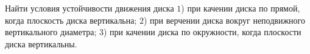 Найти условия устойчивости движения диска
$1$) при качении диска по прямой, когда плоскость диска вертикальна;
$2$) при верчении диска вокруг неподвижного вертикального диаметра;
$3$) при качении диска по окружности, когда плоскости диска вертикальны.
